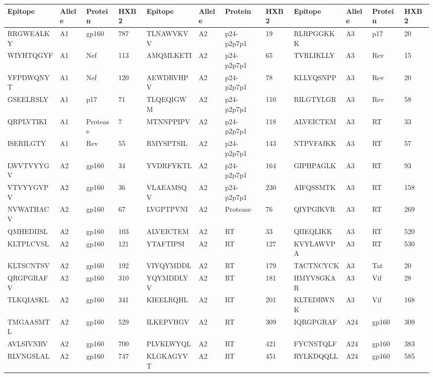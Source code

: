 \begin{table}[htp]
\begin{center}
\begin{sideways}
{
\scriptsize
\begin{tabulary}{1.5\textwidth}{|l|l|l|l|l|l|l|l|l|l|l|l|}
\hline
Epitope & Allele & Protein & HXB2 & Epitope & Allele & Protein & HXB2 & Epitope & Allele & Protein & HXB2 \bigstrut \\
\hline
RRGWEALKY & A1 & gp160 & 787 & TLNAWVKVV & A2 & p24-p2p7p1 & 19 & RLRPGGKKK & A3 & p17 & 20 \bigstrut[t] \\
WIYHTQGYF & A1 & Nef & 113 & AMQMLKETI & A2 & p24-p2p7p1 & 65 & TVRLIKLLY & A3 & Rev & 15 \\
YFPDWQNYT & A1 & Nef & 120 & AEWDRVHPV & A2 & p24-p2p7p1 & 78 & KLLYQSNPP & A3 & Rev & 20 \\
GSEELRSLY & A1 & p17 & 71 & TLQEQIGWM & A2 & p24-p2p7p1 & 110 & RILGTYLGR & A3 & Rev & 58 \\
QRPLVTIKI & A1 & Protease & 7 & MTNNPPIPV & A2 & p24-p2p7p1 & 118 & ALVEICTEM & A3 & RT & 33 \\
ISERILGTY & A1 & Rev & 55 & RMYSPTSIL & A2 & p24-p2p7p1 & 143 & NTPVFAIKK & A3 & RT & 57 \\
LWVTVYYGV & A2 & gp160 & 34 & YVDRFYKTL & A2 & p24-p2p7p1 & 164 & GIPHPAGLK & A3 & RT & 93 \\
VTVYYGVPV & A2 & gp160 & 36 & VLAEAMSQV & A2 & p24-p2p7p1 & 230 & AIFQSSMTK & A3 & RT & 158 \\
NVWATHACV & A2 & gp160 & 67 & LVGPTPVNI & A2 & Protease & 76 & QIYPGIKVR & A3 & RT & 269 \\
QMHEDIISL & A2 & gp160 & 103 & ALVEICTEM & A2 & RT & 33 & QIIEQLIKK & A3 & RT & 520 \\
KLTPLCVSL & A2 & gp160 & 121 & YTAFTIPSI & A2 & RT & 127 & KVYLAWVPA & A3 & RT & 530 \\
KLTSCNTSV & A2 & gp160 & 192 & VIYQYMDDL & A2 & RT & 179 & TACTNCYCK & A3 & Tat & 20 \\
QRGPGRAFV & A2 & gp160 & 310 & YQYMDDLYV & A2 & RT & 181 & HMYVSGKAR & A3 & Vif & 28 \\
TLKQIASKL & A2 & gp160 & 341 & KIEELRQHL & A2 & RT & 201 & KLTEDRWNK & A3 & Vif & 168 \\
TMGAASMTL & A2 & gp160 & 529 & ILKEPVHGV & A2 & RT & 309 & IQRGPGRAF & A24 & gp160 & 309 \\
AVLSIVNRV & A2 & gp160 & 700 & PLVKLWYQL & A2 & RT & 421 & FYCNSTQLF & A24 & gp160 & 383 \\
RLVNGSLAL & A2 & gp160 & 747 & KLGKAGYVT & A2 & RT & 451 & RYLKDQQLL & A24 & gp160 & 585 \\

\end{tabulary}}
\end{sideways}
\end{center}
\end{table}
